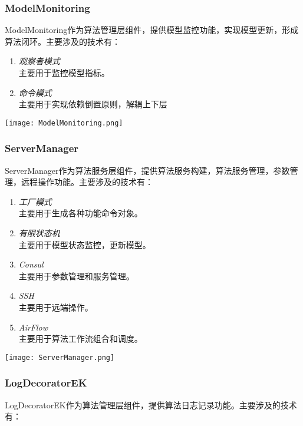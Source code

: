 \documentclass[cn,hazy,blue,14pt,screen]{elegantnote}
\begin{document}
\subsubsection{ModelMonitoring}

ModelMonitoring作为算法管理层组件，提供模型监控功能，实现模型更新，形成算法闭环。主要涉及的技术有：
\begin{enumerate}[label=\arabic*).]
	\item \textit{观察者模式}\\
	主要用于监控模型指标。
	\item \textit{命令模式}\\
	主要用于实现依赖倒置原则，解耦上下层	
\end{enumerate}

\centerline{
	\texttt{[image: ModelMonitoring.png]}
}



\subsubsection{ServerManager}

ServerManager作为算法服务层组件，提供算法服务构建，算法服务管理，参数管理，远程操作功能。主要涉及的技术有：
\begin{enumerate}[label=\arabic*).]
	\item \textit{工厂模式}\\
	主要用于生成各种功能命令对象。
	\item \textit{有限状态机}\\
	主要用于模型状态监控，更新模型。	
	\item \textit{Consul}\\
	主要用于参数管理和服务管理。
	\item \textit{SSH}\\
	主要用于远端操作。
	\item \textit{AirFlow}\\
	主要用于算法工作流组合和调度。
\end{enumerate}

\centerline{
	\texttt{[image: ServerManager.png]}
}



\subsubsection{LogDecoratorEK}

LogDecoratorEK作为算法管理层组件，提供算法日志记录功能。主要涉及的技术有：
\end{document}
